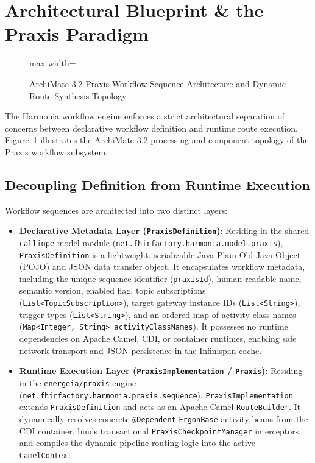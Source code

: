 \section{Architectural Blueprint \& the Praxis Paradigm}
\label{sec:praxis_paradigm}

\begin{figure}[htbp]
    \centering
    \begin{adjustbox}{max width=\textwidth}
        
    \end{adjustbox}
    \caption{ArchiMate 3.2 Praxis Workflow Sequence Architecture and Dynamic Route Synthesis Topology}
    \label{fig:praxis_workflow_architecture}
\end{figure}

The Harmonia workflow engine enforces a strict architectural separation of concerns between declarative workflow definition and runtime route execution. Figure~\ref{fig:praxis_workflow_architecture} illustrates the ArchiMate 3.2 processing and component topology of the Praxis workflow subsystem.

\subsection{Decoupling Definition from Runtime Execution}
\label{subsec:praxis_decoupling}

Workflow sequences are architected into two distinct layers:
\begin{itemize}
    \item \textbf{Declarative Metadata Layer (\texttt{PraxisDefinition})}: Residing in the shared \texttt{calliope} model module (\texttt{net.fhirfactory.harmonia.model.praxis}), \texttt{PraxisDefinition} is a lightweight, serializable Java Plain Old Java Object (POJO) and JSON data transfer object. It encapsulates workflow metadata, including the unique sequence identifier (\texttt{praxisId}), human-readable name, semantic version, enabled flag, topic subscriptions (\texttt{List<TopicSubscription>}), target gateway instance IDs (\texttt{List<String>}), trigger types (\texttt{List<String>}), and an ordered map of activity class names (\texttt{Map<Integer, String> activityClassNames}). It possesses no runtime dependencies on Apache Camel, CDI, or container runtimes, enabling safe network transport and JSON persistence in the Infinispan cache.
    \item \textbf{Runtime Execution Layer (\texttt{PraxisImplementation} / \texttt{Praxis})}: Residing in the \texttt{energeia/praxis} engine (\texttt{net.fhirfactory.harmonia.praxis.sequence}), \texttt{PraxisImplementation} extends \texttt{PraxisDefinition} and acts as an Apache Camel \texttt{RouteBuilder}. It dynamically resolves concrete \texttt{@Dependent} \texttt{ErgonBase} activity beans from the CDI container, binds transactional \texttt{PraxisCheckpointManager} interceptors, and compiles the dynamic pipeline routing logic into the active \texttt{CamelContext}.
\end{itemize}

